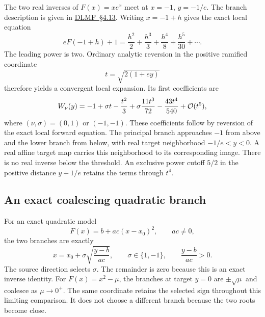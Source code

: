 The two real inverses of $F(x)=xe^x$ meet at $x=-1$, $y=-1/e$.
The branch description is given in
\href{https://dlmf.nist.gov/4.13}{DLMF~\S4.13}.
Writing $x=-1+h$ gives the exact local equation
\begin{equation}
 eF(-1+h)+1
 =\frac{h^2}{2}+\frac{h^3}{3}+\frac{h^4}{8}
 +\frac{h^5}{30}+\cdots.
 \label{eq:Lambert-threshold-forward}
\end{equation}
The leading power is two. Ordinary analytic reversion in the positive
ramified coordinate
\begin{equation}
 t=\sqrt{2(1+ey)}
 \label{eq:Lambert-threshold-uniformizer}
\end{equation}
therefore yields a convergent local expansion. Its first coefficients are
\begin{equation}
 W_\nu(y)=-1+\sigma t-\frac{t^2}{3}
 +\sigma\frac{11t^3}{72}-\frac{43t^4}{540}+\mathcal O(t^5),
 \label{eq:Lambert-threshold-inverse}
\end{equation}
where $(\nu,\sigma)=(0,1)$ or $(-1,-1)$.
These coefficients follow by reversion of the exact local forward
equation. The principal branch approaches $-1$ from above and the lower
branch from below, with real target neighborhood $-1/e<y<0$. A real
affine target map carries this neighborhood to its corresponding image.
There is no real inverse below the threshold. An exclusive power cutoff
$5/2$ in the positive distance $y+1/e$ retains the terms through $t^4$.

\subsection{An exact coalescing quadratic branch}

For an exact quadratic model
\begin{equation}
 F(x)=b+a c(x-x_0)^2,\qquad ac\ne0,
 \label{eq:quadratic-threshold-forward}
\end{equation}
the two branches are exactly
\begin{equation}
 x=x_0+\sigma\sqrt{\frac{y-b}{ac}},\qquad
 \sigma\in\{1,-1\},\qquad\frac{y-b}{ac}>0.
 \label{eq:quadratic-threshold-inverse}
\end{equation}
The source direction selects $\sigma$. The remainder is zero because this
is an exact inverse identity. For $F(x)=x^2-\mu$, the branches at target
$y=0$ are $\pm\sqrt\mu$ and coalesce as $\mu\to0^+$. The same coordinate
retains the selected sign throughout this limiting comparison. It does
not choose a different branch because the two roots become close.

